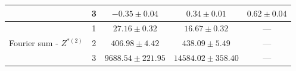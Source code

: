\begin{table}[ht]
{\begin{tabular}{ccccc}
                                             & 3                                    & $-0.35 \pm 0.04$ & $0.34 \pm 0.01$ & $0.62 \pm 0.04$ \\ \hline
    \multirow{3}{*}{Fourier sum - $Z^{*(2)}$}              & 1                                    & $27.16 \pm 0.32$ & $16.67 \pm 0.32$ & ---             \\
                                             & 2                                    & $406.98 \pm 4.42$ & $438.09 \pm 5.49$ & ---             \\
                                             & 3                                    & $9688.54 \pm 221.95$ & $14584.02 \pm 358.40$ & ---             \\ \hline
    \end{tabular}
    }
    \label{table:emis_dists}
\end{table}


